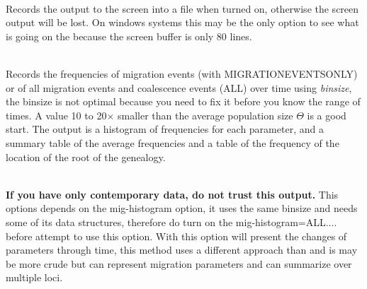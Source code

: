 \begin{description}
\item{}\\
Records the output to the screen into a file when turned on, otherwise the screen output will be lost. On windows systems this may be the only option to see what is going on the because the screen buffer is only 80 lines.

\item{}\\
Records the frequencies of migration events (with MIGRATIONEVENTSONLY) or of all migration events and coalescence events (ALL) over time using \textsl{binsize}, the binsize is not optimal because you need to fix it before you know the range of times. A value 10 to 20$\times$ smaller than the average population size $\Theta$ is a good start. The output is a histogram of frequencies for each parameter, and a summary table of the average frequencies and a table of the frequency of the location of the root of the genealogy.

\item{}\\
\textbf{ If you have only contemporary data, do not trust this output.}
This options depends on the mig-histogram option, it uses the same binsize and needs some of its data structures, therefore do turn on the mig-histogram=ALL.... before attempt to use this option. With this option \migrate will present the changes of parameters through time, this method uses a different approach than \beast and is may be more crude but can represent migration parameters and can summarize over multiple loci.
\end{description}

